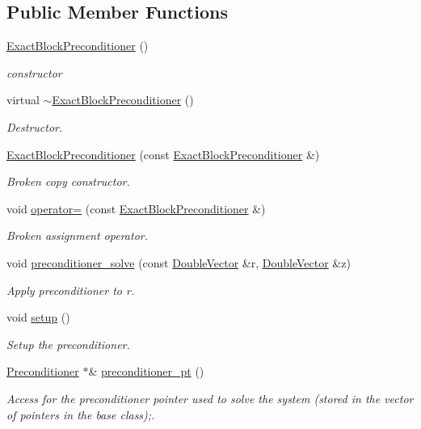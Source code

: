\subsection*{Public Member Functions}
\begin{DoxyCompactItemize}
\item 
\hyperlink{classoomph_1_1ExactBlockPreconditioner_a3bb7887f04ecbcbb6d28e7c53480a2a9}{Exact\+Block\+Preconditioner} ()
\begin{DoxyCompactList}\small\item\em constructor \end{DoxyCompactList}\item 
virtual \hyperlink{classoomph_1_1ExactBlockPreconditioner_ac3fc9a91b97bc161e521bf852a7bb99a}{$\sim$\+Exact\+Block\+Preconditioner} ()
\begin{DoxyCompactList}\small\item\em Destructor. \end{DoxyCompactList}\item 
\hyperlink{classoomph_1_1ExactBlockPreconditioner_af312d8d69e3b897ffe9ada0cd4111fc8}{Exact\+Block\+Preconditioner} (const \hyperlink{classoomph_1_1ExactBlockPreconditioner}{Exact\+Block\+Preconditioner} \&)
\begin{DoxyCompactList}\small\item\em Broken copy constructor. \end{DoxyCompactList}\item 
void \hyperlink{classoomph_1_1ExactBlockPreconditioner_ae8d338c08e792ec8c49af72d5941f198}{operator=} (const \hyperlink{classoomph_1_1ExactBlockPreconditioner}{Exact\+Block\+Preconditioner} \&)
\begin{DoxyCompactList}\small\item\em Broken assignment operator. \end{DoxyCompactList}\item 
void \hyperlink{classoomph_1_1ExactBlockPreconditioner_a4267f2937d09e9949b355a19ad107044}{preconditioner\+\_\+solve} (const \hyperlink{classoomph_1_1DoubleVector}{Double\+Vector} \&r, \hyperlink{classoomph_1_1DoubleVector}{Double\+Vector} \&z)
\begin{DoxyCompactList}\small\item\em Apply preconditioner to r. \end{DoxyCompactList}\item 
void \hyperlink{classoomph_1_1ExactBlockPreconditioner_a9961dff2ee506c32c52a04d1c0bd631d}{setup} ()
\begin{DoxyCompactList}\small\item\em Setup the preconditioner. \end{DoxyCompactList}\item 
\hyperlink{classoomph_1_1Preconditioner}{Preconditioner} $\ast$\& \hyperlink{classoomph_1_1ExactBlockPreconditioner_acc758ad816f9037f3490cec8d3f3fe9b}{preconditioner\+\_\+pt} ()
\begin{DoxyCompactList}\small\item\em Access for the preconditioner pointer used to solve the system (stored in the vector of pointers in the base class);. \end{DoxyCompactList}\end{DoxyCompactItemize}
